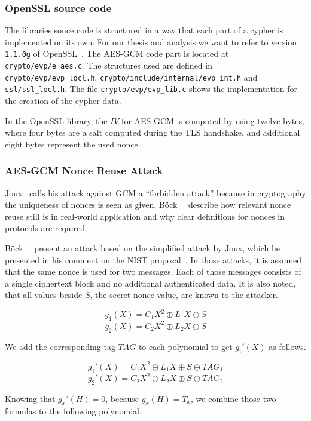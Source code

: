 \subsubsection{OpenSSL source code}

The libraries souce code is structured in a way that each part of a
cypher is implemented on its own. For our thesis and analysis we want to
refer to version \texttt{1.1.0g} of OpenSSL~\cite{opensslsource}. The AES-GCM
code part is located at \texttt{crypto/evp/e\_aes.c}. The structures used are
defined in \texttt{crypto/evp/evp\_locl.h},
\texttt{crypto/include/internal/evp\_int.h} and \texttt{ssl/ssl\_locl.h}. The
file \texttt{crypto/evp/evp\_lib.c} shows the implementation for the creation of
the cypher data.

In the OpenSSL library, the $IV$ for AES-GCM is computed by using twelve
bytes, where four bytes are a salt computed during the TLS handshake, and
additional eight bytes represent the used nonce.

\subsubsection{AES-GCM Nonce Reuse Attack}

Joux~\cite{NISTGCMcomment} calls his attack against GCM a ``forbidden attack''
because in cryptography the uniqueness of nonces is seen as given.
Böck~\etal~\cite{gcmnonceattack} describe how relevant nonce reuse still is in
real-world application and why clear definitions for nonces in protocols are
required.

Böck~\etal~\cite{gcmnonceattack} present an attack based on the simplified
attack by Joux, which he presented in his comment on the NIST
proposal~\cite{NISTGCMcomment}.  In those attacks, it is assumed that the same
nonce is used for two messages. Each of those messages consists of a single
ciphertext block and no additional authenticated data. It is also noted, that
all values beside $S$, the secret nonce value, are known to the attacker.

\[g_1(X) = C{_{1}X^2 \oplus L_1X \oplus S}\]
\[g_2(X) = C{_{2}X^2 \oplus L_2X \oplus S}\]

We add the corresponding tag $TAG$ to each polynomial to get $g_i'(X)$ as
follows.

\[g_1'(X) = C{_{1}X^2 \oplus L_1X \oplus S \oplus TAG_1}\]
\[g_2'(X) = C{_{2}X^2 \oplus L_2X \oplus S \oplus TAG_2}\]

Knowing that $g_x'(H) = 0$, because $g_x(H) = T_x$, we combine those two
formulas to the following polynomial.

